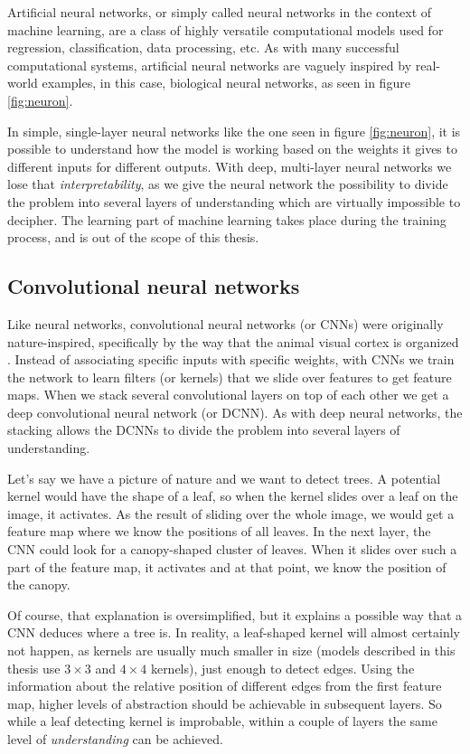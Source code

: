 Artificial neural networks, or simply called neural networks in the context of 
machine learning, are a class of highly versatile computational models used for 
regression, classification, data processing, etc. As with many successful computational 
systems, artificial neural networks are vaguely inspired by real-world examples,
in this case, biological neural networks, as seen in figure \ref{fig:neuron}. 

In simple, single-layer neural networks like the one seen in figure \ref{fig:neuron}, 
it is possible to understand how the model is working based on the weights it gives
to different inputs for different outputs. With deep, multi-layer neural networks 
we lose that \textit{interpretability}, as we give the neural network the possibility
to divide the problem into several layers of understanding which are virtually 
impossible to decipher. The learning part of machine learning takes place during the
training process, and is out of the scope of this thesis.

\subsection{Convolutional neural networks}
\label{sec:cnn}

Like neural networks, convolutional neural networks (or CNNs) were originally 
nature-inspired, specifically by the way that the animal visual cortex is 
organized \citep{fukushima1980neocognitron}. Instead of associating specific
inputs with specific weights, with CNNs we train the network to learn filters 
(or kernels) that we slide over features to get feature maps. When we stack
several convolutional layers on top of each other we get a deep convolutional
neural network (or DCNN). As with deep neural networks, the stacking allows 
the DCNNs to divide the problem into several layers of understanding. 

Let's say we have a picture of nature and we want to detect trees. A potential 
kernel would have the shape of a leaf, so when the kernel slides over a leaf on
the image, it activates. As the result of sliding over the whole image, we would
get a feature map where we know the positions of all leaves. In the next layer, 
the CNN could look for a canopy-shaped cluster of leaves. When it slides
over such a part of the feature map, it activates and at that point, we know the position
of the canopy.

Of course, that explanation is oversimplified, but it explains a possible way 
that a CNN deduces where a tree is. In reality, a leaf-shaped kernel will almost
certainly not happen, as kernels are usually much smaller in size (models
described in this thesis use $3\times3$ and $4\times4$ kernels), just enough to 
detect edges. Using the information about the relative position of different edges
from the first feature map, higher levels of abstraction should be achievable in 
subsequent layers. So while a leaf detecting kernel is improbable, within a couple
of layers the same level of \textit{understanding} can be achieved.

